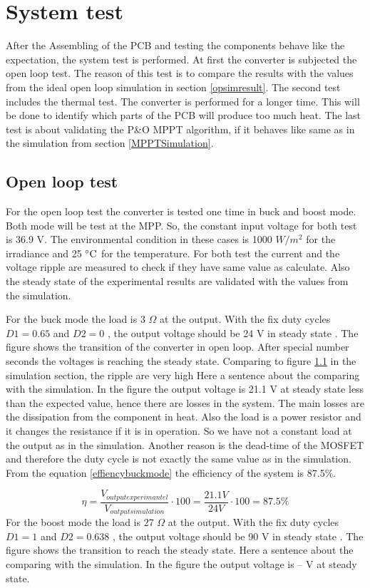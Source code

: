 \section{System test}
After the Assembling of the PCB and testing the components behave like the expectation, the system test is performed. At first the converter is subjected the open loop test. The reason of this test is to compare the results with the values from the ideal open loop simulation in section \ref{opsimresult}. The second test includes the thermal test. The converter is performed for a longer time. This will be done to identify which parts of the PCB will produce too much heat. The last test is about validating the P\&O MPPT algorithm, if it behaves like same as in the simulation from section \ref{MPPTSimulation}.

\subsection{Open loop test}
For the open loop test the converter is tested one time in buck and boost mode. Both mode will be test at the MPP. So, the constant input voltage for both test is 36.9 V. The environmental condition in these cases is 1000 $W /m^2$ for the irradiance and 25 $\decC$ for the temperature. For both test the current and the voltage ripple are measured to check if they have same value as calculate. Also the steady state of the experimental results are validated with the values from the simulation.

For the buck mode the load is 3 $\Omega$ at the output. With the fix duty cycles $D1 = 0.65$ and  $D2 = 0$ , the output voltage should be 24 V in steady state . The figure shows the transition of the converter in open loop. After special number seconds  the voltages is reaching the steady state. Comparing to figure \ref{} in the simulation section, the ripple are very high Here a sentence about the comparing with the simulation.  In the figure the output voltage is 21.1 V  at steady state less than the expected value, hence there are losses in the system.
The main losses are the dissipation from the component in heat. Also the load is a power resistor and it changes the resistance if it is in operation. So we have not a constant load at the output as in the simulation. Another reason is the dead-time of the MOSFET and therefore the duty cycle is not exactly the same value as in the simulation. From the equation \ref{effiencybuckmode} the efficiency of the system is 87.5$\%$.

\begin{equation}\label{effiencybuckmode}
\eta = \frac{V_{outputexperimantel}}{V_{output simulation}} \cdot 100 = \frac{21.1V}{24V} \cdot 100 = 87.5 \%
\end{equation}
For the boost mode the load is 27 $\Omega$ at the output. With the fix duty cycles $D1 = 1$ and  $D2 = 0.638$ , the output voltage should be 90 V in steady state . The figure shows the transition to reach the steady state. Here a sentence about the comparing with the simulation.  In the figure the output voltage is -- V  at steady state.

